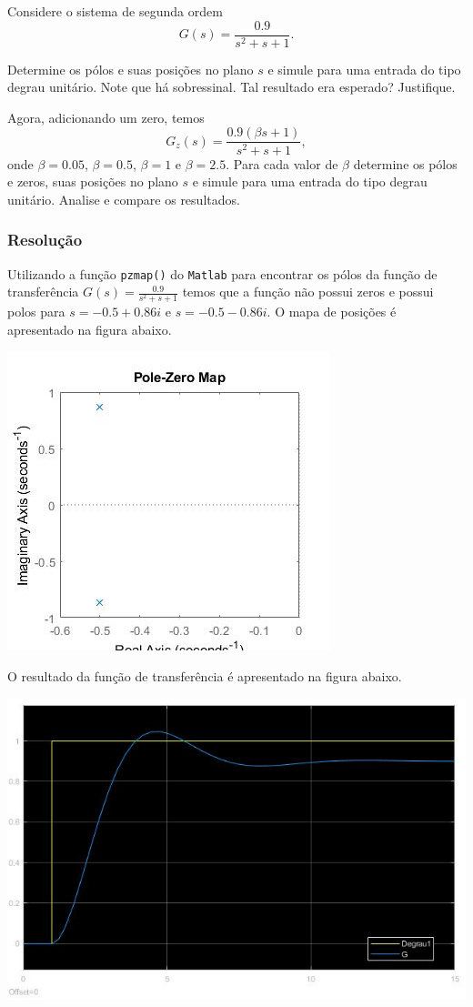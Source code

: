 \documentclass[
]{book}
\begin{document}
Considere o sistema de segunda ordem
\[
G(s) = \frac {0.9}{s^2+s+1}.
\]

Determine os pólos e suas posições no plano \(s\) e simule para uma entrada do tipo degrau unitário. Note que há sobressinal. Tal resultado era esperado? Justifique.

Agora, adicionando um zero, temos
\[
G_z(s) = \frac {0.9(\beta s+1)}{s^2+s+1},
\]
onde \(\beta = 0.05\), \(\beta = 0.5\), \(\beta = 1\) e \(\beta = 2.5\). Para cada valor de \(\beta\) determine os pólos e zeros, suas posições no plano \(s\) e simule para uma entrada do tipo degrau unitário. Analise e compare os resultados.

\hypertarget{resoluuxe7uxe3o-4}{%
\subsubsection*{Resolução}\label{resoluuxe7uxe3o-4}}

Utilizando a função \texttt{pzmap()} do \texttt{Matlab} para encontrar os pólos da função de transferência \(G(s) = \frac {0.9}{s^2+s+1}\) temos que a função não possui zeros e possui polos para \(s = -0.5 + 0.86i\) e \(s = -0.5 -0.86i\). O mapa de posições é apresentado na figura abaixo.

\includegraphics{Imagens/Lab2/prob5.jpg}

O resultado da função de transferência é apresentado na figura abaixo.

\includegraphics{imagens/Lab2/prob5Sim.jpg}
\end{document}
